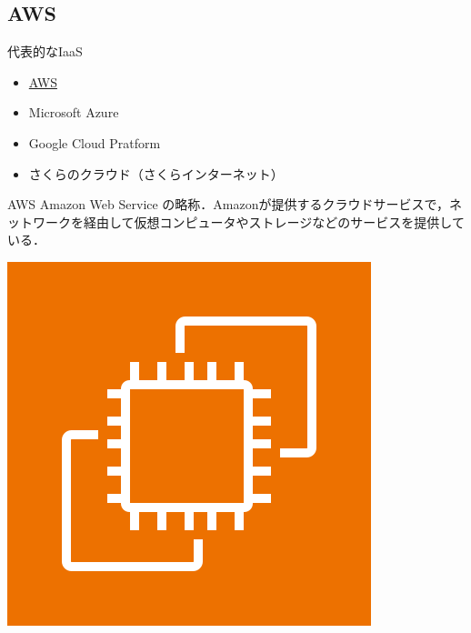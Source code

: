 \subsection{AWS}
\begin{frame}[t]{\ftitle}
    代表的なIaaS
    \begin{itemize}
        \setlength{\itemsep}{1em}
        \item \underline{AWS}
        \item Microsoft Azure
        \item Google Cloud Pratform
        \item さくらのクラウド（さくらインターネット）
    \end{itemize}
\end{frame}
\begin{frame}[t]{\ftitle}
    \begin{block}{AWS}
        Amazon Web Service の略称．Amazonが提供するクラウドサービスで，ネットワークを経由して仮想コンピュータやストレージなどのサービスを提供している．\hfill\cite{2015amazon}
    \end{block}
    \begin{minipage}{\textwidth}
        \centering
        \begin{minipage}[t]{.32\textwidth}
            \centering
            \includegraphics[keepaspectratio,width=\textwidth]{Arch_Amazon-EC2_64@5x.png}\\

\end{minipage}
\end{minipage}
\end{frame}
